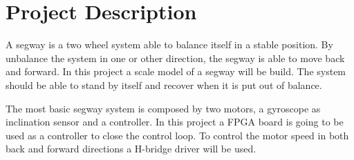 \section*{Project Description}

A segway is a two wheel system able to balance itself in a stable position. 
By unbalance the system in one or other direction, the segway is able to move back and forward.
In this project a scale model of a segway will be build.
The system should be able to stand by itself and recover when it is put out of balance.

The most basic segway system is composed by two motors, a gyroscope as inclination sensor and a controller.
In this project a FPGA board is going to be used as a controller to close the control loop.
To control the motor speed in both back and forward directions a H-bridge driver will be used.




